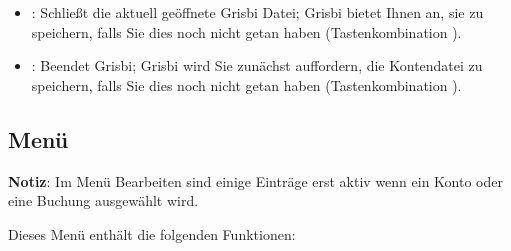 \begin{itemize}
	\item {}: Schließt die aktuell geöffnete Grisbi Datei; Grisbi bietet Ihnen an, sie zu speichern, falls Sie dies noch nicht getan haben (Tastenkombination ). %
	\item {}: Beendet Grisbi; Grisbi wird Sie zunächst auffordern, die Kontendatei zu speichern, falls Sie dies noch nicht getan haben (Tastenkombination ).%
\end{itemize}


\subsection{Menü \label{home-menus-edit}}

\textbf{Notiz}: Im Menü Bearbeiten sind einige Einträge erst aktiv wenn ein Konto oder eine Buchung ausgewählt wird.

Dieses Menü enthält die folgenden Funktionen:%

